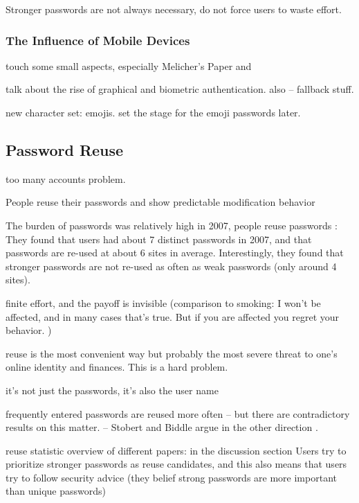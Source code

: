 	Stronger passwords are not always necessary, do not force users to waste effort. \cite{Florencio2007DoStrongWebPasswords}	
	
	\cite{Shay2014ReligiousAunt}
	
	\subsubsection{The Influence of Mobile Devices}
	touch some small aspects, especially Melicher's Paper \cite{Melicher2016UsabilityMobileTextPasswords} and \cite{VonZezschwitz2014HoneyIShrunkTheKeys}
	\cite{Haque2014PsychometricsStrongPassword} 
	
	talk about the rise of graphical and biometric authentication. 
	also \cite{Cherapau2015ImpactOfTouchID} -- fallback stuff.
	
	new character set: emojis.
	set the stage for the emoji passwords later. 

	\subsection{Password Reuse}
	too many accounts problem.
	
	People reuse their passwords and show predictable modification behavior \cite{Gaw2005ReuseRecycle}
	
	The burden of passwords was relatively high in 2007, people reuse passwords \cite{Florencio2007LargeScaleStudyPasswordHabits}: They found that users had about 7 distinct passwords in 2007, and that passwords are re-used at about 6 sites in average. Interestingly, they found that stronger passwords are not re-used as often as weak passwords (only around 4 sites). 
	
	finite effort, and the payoff is invisible (comparison to smoking: I won't be affected, and in many cases that's true. But if you are affected you regret your behavior. )
	
	reuse is the most convenient way but probably the most severe threat to one's online identity and finances. This is a hard problem. 
	
	it's not just the passwords, it's also the user name 
	
	frequently entered passwords are reused more often \cite{Wash2016UnderstandingPasswordChoices} -- but there are contradictory results on this matter. -- Stobert and Biddle argue in the other direction \cite{Stobert2014PasswordLifeCycle}. 
	
	reuse statistic overview of different papers: 
	\cite{Wash2016UnderstandingPasswordChoices} in the discussion section
	Users try to prioritize stronger passwords as reuse candidates, and this also means that users try to follow security advice (they belief strong passwords are more important than unique passwords) \cite{Wash2016UnderstandingPasswordChoices}
	
